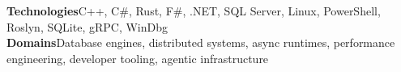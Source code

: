
\begin{cvparagraph}
\textbf{Technologies}\enskip C++, {C\#}, Rust, F\#, .NET, SQL Server, Linux, PowerShell, Roslyn, SQLite, gRPC, WinDbg\\
\textbf{Domains}\enskip Database engines, distributed systems, async runtimes, performance engineering, developer tooling, agentic infrastructure
\end{cvparagraph}

